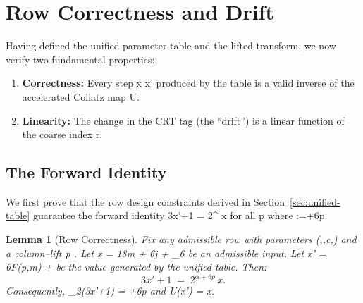 \documentclass[11pt,letterpaper]{amsart}
\def\({}%
\def\){}%
\theoremstyle{definition}
\theoremstyle{plain}
\newtheorem{lemma}{Lemma}
\theoremstyle{plain}
\theoremstyle{remark}
\begin{document}
\section{Row Correctness and Drift}
\label{sec:row-correctness}

Having defined the unified parameter table and the lifted transform, we now verify two fundamental properties:
\begin{enumerate}
    \item \textbf{Correctness:} Every step \(x \mapsto x'\) produced by the table is a valid inverse of the accelerated Collatz map \(U\).
    \item \textbf{Linearity:} The change in the CRT tag (the ``drift'') is a linear function of the coarse index \(r\).
\end{enumerate}

\subsection{The Forward Identity}
\label{subsec:forward-identity}

We first prove that the row design constraints derived in Section~\ref{sec:unified-table} guarantee the forward identity \(3x'+1 = 2^{\sigma} x\) for all \(p \) where \(\sigma:=\alpha+6p\).

\begin{lemma}[Row Correctness]
\label{lem:row-correctness}
Fix any admissible row with parameters \((\alpha,\beta,c,\delta)\) and a column--lift \(p \). Let \(x = 18m + 6j + \delta_{6}\) be an admissible input. Let \(x' = 6F(p,m) + \delta\) be the value generated by the unified table. Then:
\begin{equation}
3x' + 1 \;=\; 2^{\alpha+6p}\,x.
\end{equation}
Consequently, \(\nu_2(3x'+1) = \alpha+6p\) and \(U(x') = x\).
\end{lemma}
\end{document}
